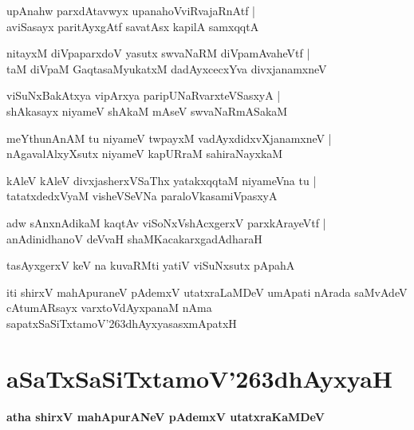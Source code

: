 \documentclass[twoside,12pt,openright]{book}
\def\S{\char'263}
\newcounter{shloka}[chapter]
\begin{document}
\begin{shloka}%
upAnahw parxdAtavwyx upanahoVviRvajaRnAtf |\\
aviSasayx paritAyxgAtf savatAsx kapilA samxqqtA
\end{shloka}

\begin{shloka}%
nitayxM diVpaparxdoV yasutx swvaNaRM diVpamAvaheVtf |\\
taM diVpaM GaqtasaMyukatxM dadAyxcecxYva divxjanamxneV 
\end{shloka}

\begin{shloka}%
viSuNxBakAtxya vipArxya paripUNaRvarxteVSasxyA |\\
shAkasayx niyameV shAkaM mAseV swvaNaRmASakaM
\end{shloka}

\begin{shloka}%
meYthunAnAM tu niyameV twpayxM vadAyxdidxvXjanamxneV |\\
nAgavalAlxyXsutx niyameV kapURraM sahiraNayxkaM
\end{shloka}

\begin{shloka}%
kAleV kAleV divxjasherxVSaThx yatakxqqtaM niyameVna tu |\\
tatatxdedxVyaM visheVSeVNa paraloVkasamiVpasxyA 
\end{shloka}

\begin{shloka}%
adw sAnxnAdikaM kaqtAv viSoNxVshAcxgerxV parxkArayeVtf |\\
anAdinidhanoV deVvaH shaMKacakarxgadAdharaH 
\end{shloka}

\begin{shloka}%
tasAyxgerxV keV na kuvaRMti yatiV viSuNxsutx pApahA 
\end{shloka}

\begin{center}
iti shirxV mahApuraneV pAdemxV utatxraLaMDeV umApati nArada saMvAdeV cAtumARsayx varxtoVdAyxpanaM 
nAma sapatxSaSiTxtamoV\S dhAyxyasasxmApatxH
\end{center}

\chapter{aSaTxSaSiTxtamoV\S dhAyxyaH}

\begin{center}
{\LARGE\bfseries atha shirxV mahApurANeV pAdemxV utatxraKaMDeV}
\end{center}
\end{document}
